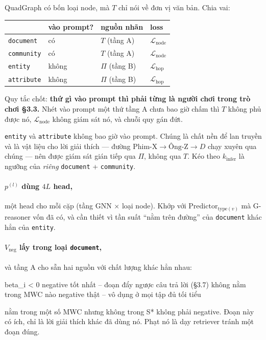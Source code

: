 \documentclass[11pt,a4paper]{article}
\begin{document}
QuadGraph có bốn loại node, mà $T$ chỉ nói về đơn vị văn bản. Chia vai:

\begin{center}
\begin{tabular}{@{}llll@{}}
\toprule
 & vào prompt? & nguồn nhãn & loss \\
\midrule
\texttt{document}  & có     & $T$ (tầng A)   & $\mathcal{L}_{\text{node}}$ \\
\texttt{community} & có     & $T$ (tầng A)   & $\mathcal{L}_{\text{node}}$ \\
\texttt{entity}    & không  & $\Pi$ (tầng B) & $\mathcal{L}_{\text{hop}}$ \\
\texttt{attribute} & không  & $\Pi$ (tầng B) & $\mathcal{L}_{\text{hop}}$ \\
\bottomrule
\end{tabular}
\end{center}

Quy tắc chốt: \textbf{thứ gì vào prompt thì phải từng là người chơi trong trò chơi \S3.3.}
Nhét vào prompt một thứ tầng A chưa bao giờ chấm thì $T$ không phủ được nó,
$\mathcal{L}_{\text{node}}$ không giám sát nó, và chuỗi quy gán đứt.

\texttt{entity} và \texttt{attribute} không bao giờ vào prompt. Chúng là chất nền để lan
truyền và là vật liệu cho lời giải thích --- đường $\text{Phim-X}\to\text{Ông-Z}\to D$ chạy
xuyên qua chúng --- nên được giám sát gián tiếp qua $\Pi$, không qua $T$. Kéo theo
$k_{\text{infer}}$ là ngưỡng của \emph{riêng} \texttt{document} + \texttt{community}.

\paragraph{$p^{(l)}$ dùng $4L$ head,} một head cho mỗi cặp (tầng GNN $\times$ loại node).
Khớp với $\mathrm{Predictor}_{\mathrm{type}(v)}$ mà G-reasoner vốn đã có, và cần thiết vì
tần suất ``nằm trên đường'' của \texttt{document} khác hẳn của \texttt{entity}.

\paragraph{$V_{\text{neg}}$ lấy trong loại \texttt{document},} và tầng A cho sẵn hai nguồn
với chất lượng khác hẳn nhau:

\begin{dia}
beta_i < 0                negative tốt nhất -- đoạn đẩy ngược câu trả lời (§3.7)
không nằm trong MWC nào   negative thật -- vô dụng ở mọi tập đủ tối tiểu

nằm trong một số MWC nhưng không trong S*
                          không phải negative. Đoạn này có ích, chỉ là lời giải
                          thích khác đã dùng nó. Phạt nó là dạy retriever tránh
                          một đoạn đúng.
\end{dia}
\end{document}
